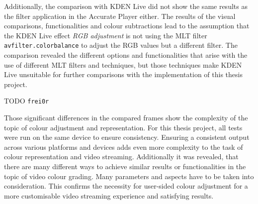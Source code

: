 \documentclass[../MasterThesis.tex]{subfiles}
\begin{document}
Additionally, the comparison with KDEN Live did not show the same results as the filter application in the Accurate Player either. The results of the visual comparisons, functionalities and colour subtractions lead to the assumption that the KDEN Live effect \textit{RGB adjustment} is not using the MLT filter \texttt{avfilter.colorbalance} to adjust the RGB values but a different filter.
The comparison revealed the different options and functionalities that arise with the use of different MLT filters and techniques, but those techniques make KDEN Live unsuitable for further comparisons with the implementation of this thesis project.

TODO \texttt{frei0r}


Those significant differences in the compared frames show the complexity of the topic of colour adjustment and representation. 
For this thesis project, all tests were run on the same device to ensure consistency. 
Ensuring a consistent output across various platforms and devices adds even more complexity to the task of colour representation and video streaming.
%
Additionally it was revealed, that there are many different ways to achieve similar results or functionalities in the topic of video colour grading. Many parameters and aspects have to be taken into consideration. This confirms the necessity for user-sided colour adjustment for a more customisable video streaming experience and satisfying results. 
	
	
	
\end{document}
